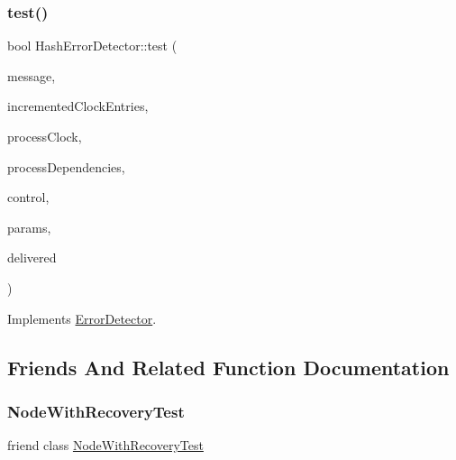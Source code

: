 \subsubsection{\texorpdfstring{test()}{test()}}
{\footnotesize\ttfamily bool Hash\+Error\+Detector\+::test (\begin{DoxyParamCaption}\item[{\hyperlink{structures_8h_a7e7bdc1d2fff8a9436f2f352b2711ed6}{message\+Info}}]{message,  }\item[{const vector$<$ unsigned int $>$ \&}]{incremented\+Clock\+Entries,  }\item[{const \hyperlink{classProbabilisticClock}{Probabilistic\+Clock} \&}]{process\+Clock,  }\item[{const \hyperlink{classTotalDependencies}{Total\+Dependencies} \&}]{process\+Dependencies,  }\item[{\hyperlink{classController}{Controller} $\ast$}]{control,  }\item[{\hyperlink{classSimulationParameters}{Simulation\+Parameters} $\ast$}]{params,  }\item[{const vector$<$ \hyperlink{structures_8h_a7e7bdc1d2fff8a9436f2f352b2711ed6}{message\+Info} $>$ \&}]{delivered }\end{DoxyParamCaption})\hspace{0.3cm}{\ttfamily [virtual]}}



Implements \hyperlink{classErrorDetector_afc717d04768dd207196c08e24163115c}{Error\+Detector}.



\subsection{Friends And Related Function Documentation}
\mbox{\label{classHashErrorDetector_a4a759c82473f06c7e89c3d75a509a390}} 
\subsubsection{\texorpdfstring{Node\+With\+Recovery\+Test}{NodeWithRecoveryTest}}
{\footnotesize\ttfamily friend class \hyperlink{classNodeWithRecoveryTest}{Node\+With\+Recovery\+Test}\hspace{0.3cm}{\ttfamily [friend]}}

